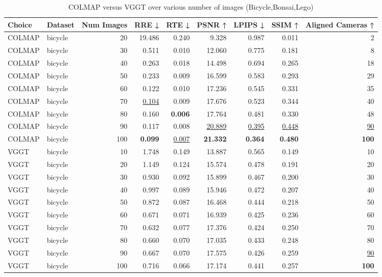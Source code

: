 \begin{table}[H]
\caption{COLMAP versus VGGT over various number of images (Bicycle,Bonsai,Lego)}
\label{tab:01_num_images_bicycle,bonsai,lego}
\small
\begin{tabular}{llrrrrrrr}
\toprule
Choice & Dataset & Num Images & RRE ↓ & RTE ↓ & PSNR ↑ & LPIPS ↓ & SSIM ↑ & Aligned Cameras ↑ \\
\midrule
COLMAP & bicycle & 20 & 19.486 & 0.240 & 9.328 & 0.987 & 0.011 & 2 \\
COLMAP & bicycle & 30 & 0.511 & 0.010 & 12.060 & 0.775 & 0.181 & 8 \\
COLMAP & bicycle & 40 & 0.263 & 0.018 & 14.498 & 0.694 & 0.265 & 18 \\
COLMAP & bicycle & 50 & 0.233 & 0.009 & 16.599 & 0.583 & 0.293 & 29 \\
COLMAP & bicycle & 60 & 0.122 & 0.010 & 17.236 & 0.545 & 0.331 & 35 \\
COLMAP & bicycle & 70 & \underline{0.104} & 0.009 & 17.676 & 0.523 & 0.344 & 40 \\
COLMAP & bicycle & 80 & 0.160 & \textbf{0.006} & 17.764 & 0.481 & 0.330 & 48 \\
COLMAP & bicycle & 90 & 0.117 & 0.008 & \underline{20.889} & \underline{0.395} & \underline{0.448} & \underline{90} \\
COLMAP & bicycle & 100 & \textbf{0.099} & \underline{0.007} & \textbf{21.332} & \textbf{0.364} & \textbf{0.480} & \textbf{100} \\
VGGT & bicycle & 10 & 1.748 & 0.149 & 13.887 & 0.565 & 0.149 & 10 \\
VGGT & bicycle & 20 & 1.149 & 0.124 & 15.574 & 0.478 & 0.191 & 20 \\
VGGT & bicycle & 30 & 0.930 & 0.092 & 15.899 & 0.467 & 0.200 & 30 \\
VGGT & bicycle & 40 & 0.997 & 0.089 & 15.946 & 0.472 & 0.207 & 40 \\
VGGT & bicycle & 50 & 0.872 & 0.087 & 16.468 & 0.444 & 0.218 & 50 \\
VGGT & bicycle & 60 & 0.671 & 0.071 & 16.939 & 0.425 & 0.236 & 60 \\
VGGT & bicycle & 70 & 0.632 & 0.077 & 17.376 & 0.424 & 0.250 & 70 \\
VGGT & bicycle & 80 & 0.660 & 0.070 & 17.035 & 0.433 & 0.248 & 80 \\
VGGT & bicycle & 90 & 0.667 & 0.070 & 17.575 & 0.426 & 0.259 & \underline{90} \\
VGGT & bicycle & 100 & 0.716 & 0.066 & 17.174 & 0.441 & 0.257 & \textbf{100} \\

\end{tabular}
\end{table}

